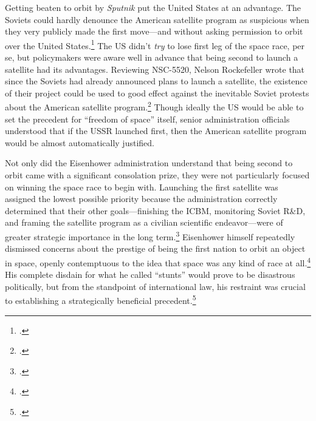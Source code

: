 \documentclass{memoir}
\begin{document}
Getting beaten to orbit by \emph{Sputnik} put the United States at an advantage. The Soviets could hardly denounce the American satellite program as suspicious when they very publicly made the first move---and without asking permission to orbit over the United States.\footcite[p.~40]{peebles_corona_1997} The US didn't \emph{try} to lose first leg of the space race, per se, but policymakers were aware well in advance that being second to launch a satellite had its advantages. Reviewing NSC-5520, Nelson Rockefeller wrote that since the Soviets had already announced plans to launch a satellite, the existence of their project could be used to good effect against the inevitable Soviet protests about the American satellite program.\footcite[p.~120]{mcdougall_heavens_1985} Though ideally the US would be able to set the precedent for ``freedom of space'' itself, senior administration officials understood that if the USSR launched first, then the American satellite program would be almost automatically justified.

Not only did the Eisenhower administration understand that being second to orbit came with a significant consolation prize, they were not particularly focused on winning the space race to begin with. Launching the first satellite was assigned the lowest possible priority because the administration correctly determined that their other goals---finishing the ICBM, monitoring Soviet R\&D, and framing the satellite program as a civilian scientific endeavor---were of greater strategic importance in the long term.\footcite[p.~123-124]{mcdougall_heavens_1985} Eisenhower himself repeatedly dismissed concerns about the prestige of being the first nation to orbit an object in space, openly contemptuous to the idea that space was any kind of race at all.\footcite[p.~100]{lindgren_trust_2000} His complete disdain for what he called ``stunts'' would prove to be disastrous politically, but from the standpoint of international law, his restraint was crucial to establishing a strategically beneficial precedent.\footcite[p.~134]{day_eye_2015}
\end{document}
